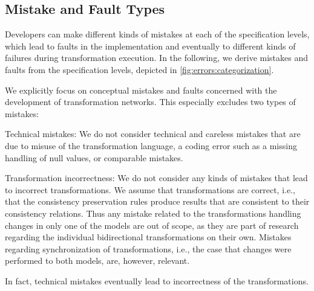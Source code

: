 \subsection{Mistake and Fault Types}
\label{chap:errors:categorization:mistakes}



Developers can make different kinds of mistakes at each of the specification levels, which lead to faults in the implementation and eventually to different kinds of failures during transformation execution.
In the following, we derive mistakes and faults from the specification levels, depicted in \autoref{fig:errors:categorization}.

We explicitly focus on conceptual mistakes and faults concerned with the development of transformation networks.
This especially excludes two types of mistakes:
\begin{properdescription}
    \item[Technical mistakes:] We do not consider technical and careless mistakes that are due to misuse of the transformation language, a coding error such as a missing handling of null values, or comparable mistakes.
    \item[Transformation incorrectness:] We do not consider any kinds of mistakes that lead to incorrect transformations. We assume that transformations are correct, i.e., that the consistency preservation rules produce results that are consistent to their consistency relations. Thus any mistake related to the transformations handling changes in only one of the models are out of scope, as they are part of research regarding the individual bidirectional transformations on their own. Mistakes regarding synchronization of transformations, i.e., the case that changes were performed to both models, are, however, relevant.
\end{properdescription}
In fact, technical mistakes eventually lead to incorrectness of the transformations.


